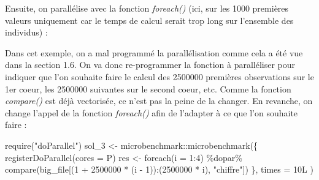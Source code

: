 \documentclass[
]{book}
\newenvironment{Shaded}{\begin{snugshade}}{\end{snugshade}}
\newcommand{\AttributeTok}[1]{\textcolor[rgb]{0.77,0.63,0.00}{#1}}
\newcommand{\DecValTok}[1]{\textcolor[rgb]{0.00,0.00,0.81}{#1}}
\newcommand{\FunctionTok}[1]{\textcolor[rgb]{0.00,0.00,0.00}{#1}}
\newcommand{\NormalTok}[1]{#1}
\newcommand{\OtherTok}[1]{\textcolor[rgb]{0.56,0.35,0.01}{#1}}
\newcommand{\SpecialCharTok}[1]{\textcolor[rgb]{0.00,0.00,0.00}{#1}}
\newcommand{\StringTok}[1]{\textcolor[rgb]{0.31,0.60,0.02}{#1}}
\theoremstyle{definition}
\theoremstyle{definition}
\theoremstyle{definition}
\theoremstyle{definition}
\theoremstyle{remark}
\begin{document}
Ensuite, on parallélise avec la fonction \emph{foreach()} (ici, sur les 1000 premières valeurs uniquement car le temps de calcul serait trop long sur l'ensemble des individus) :

\begin{Shaded}
\end{Shaded}

Dans cet exemple, on a mal programmé la parallélisation comme cela a été vue dans la section 1.6. On va donc re-programmer la fonction à paralléliser pour indiquer que l'on souhaite faire le calcul des 2500000 premières observations sur le 1er coeur, les 2500000 suivantes sur le second coeur, etc. Comme la fonction \emph{compare()} est déjà vectorisée, ce n'est pas la peine de la changer. En revanche, on change l'appel de la fonction \emph{foreach()} afin de l'adapter à ce que l'on souhaite faire :

\begin{Shaded}
\begin{Highlighting}[]
\FunctionTok{require}\NormalTok{(}\StringTok{"doParallel"}\NormalTok{)}
\NormalTok{sol\_3 }\OtherTok{\textless{}{-}}\NormalTok{ microbenchmark}\SpecialCharTok{::}\FunctionTok{microbenchmark}\NormalTok{(\{}
\FunctionTok{registerDoParallel}\NormalTok{(}\AttributeTok{cores =}\NormalTok{ P) }
\NormalTok{res }\OtherTok{\textless{}{-}} \FunctionTok{foreach}\NormalTok{(}\AttributeTok{i =} \DecValTok{1}\SpecialCharTok{:}\DecValTok{4}\NormalTok{) }\SpecialCharTok{\%dopar\%} 
  \FunctionTok{compare}\NormalTok{(big\_file[(}\DecValTok{1} \SpecialCharTok{+} \DecValTok{2500000} \SpecialCharTok{*}\NormalTok{ (i }\SpecialCharTok{{-}} \DecValTok{1}\NormalTok{))}\SpecialCharTok{:}\NormalTok{(}\DecValTok{2500000} \SpecialCharTok{*}\NormalTok{ i),                           }\StringTok{"chiffre"}\NormalTok{])}
\NormalTok{\}, }\AttributeTok{times =}\NormalTok{ 10L}
\NormalTok{)}
\end{Highlighting}
\end{Shaded}
\end{document}
